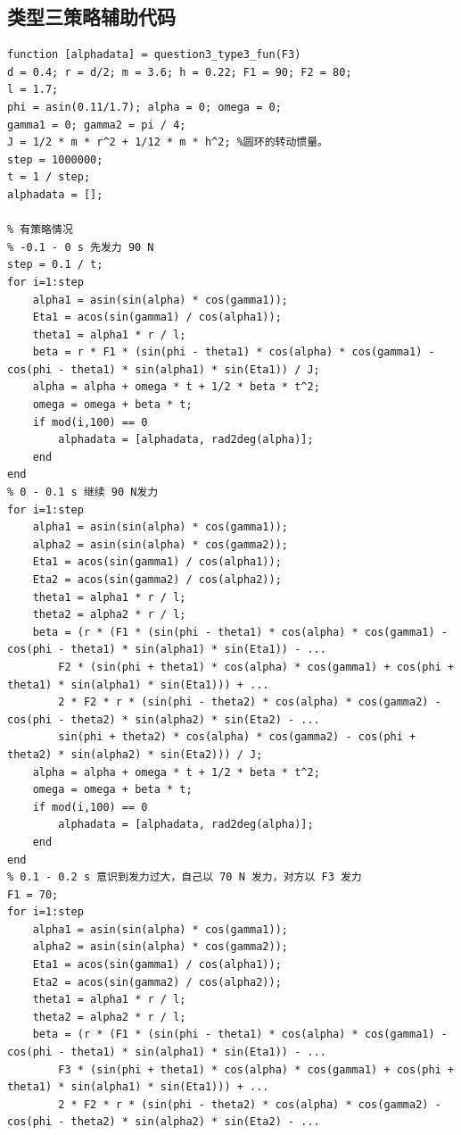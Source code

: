 \documentclass{cumcm}
\begin{document}
\subsection{类型三策略辅助代码}
\begin{lstlisting}
function [alphadata] = question3_type3_fun(F3)
d = 0.4; r = d/2; m = 3.6; h = 0.22; F1 = 90; F2 = 80;
l = 1.7;
phi = asin(0.11/1.7); alpha = 0; omega = 0;
gamma1 = 0; gamma2 = pi / 4;
J = 1/2 * m * r^2 + 1/12 * m * h^2; %圆环的转动惯量。
step = 1000000;
t = 1 / step;
alphadata = [];

% 有策略情况
% -0.1 - 0 s 先发力 90 N
step = 0.1 / t;
for i=1:step
    alpha1 = asin(sin(alpha) * cos(gamma1));
    Eta1 = acos(sin(gamma1) / cos(alpha1));
    theta1 = alpha1 * r / l;
    beta = r * F1 * (sin(phi - theta1) * cos(alpha) * cos(gamma1) - cos(phi - theta1) * sin(alpha1) * sin(Eta1)) / J;
    alpha = alpha + omega * t + 1/2 * beta * t^2;
    omega = omega + beta * t;
    if mod(i,100) == 0
        alphadata = [alphadata, rad2deg(alpha)];
    end
end
% 0 - 0.1 s 继续 90 N发力
for i=1:step
    alpha1 = asin(sin(alpha) * cos(gamma1));
    alpha2 = asin(sin(alpha) * cos(gamma2));
    Eta1 = acos(sin(gamma1) / cos(alpha1));
    Eta2 = acos(sin(gamma2) / cos(alpha2));
    theta1 = alpha1 * r / l;
    theta2 = alpha2 * r / l;
    beta = (r * (F1 * (sin(phi - theta1) * cos(alpha) * cos(gamma1) - cos(phi - theta1) * sin(alpha1) * sin(Eta1)) - ...
        F2 * (sin(phi + theta1) * cos(alpha) * cos(gamma1) + cos(phi + theta1) * sin(alpha1) * sin(Eta1))) + ...
        2 * F2 * r * (sin(phi - theta2) * cos(alpha) * cos(gamma2) - cos(phi - theta2) * sin(alpha2) * sin(Eta2) - ...
        sin(phi + theta2) * cos(alpha) * cos(gamma2) - cos(phi + theta2) * sin(alpha2) * sin(Eta2))) / J;
    alpha = alpha + omega * t + 1/2 * beta * t^2;
    omega = omega + beta * t;
    if mod(i,100) == 0
        alphadata = [alphadata, rad2deg(alpha)];
    end
end
% 0.1 - 0.2 s 意识到发力过大，自己以 70 N 发力，对方以 F3 发力
F1 = 70;
for i=1:step
    alpha1 = asin(sin(alpha) * cos(gamma1));
    alpha2 = asin(sin(alpha) * cos(gamma2));
    Eta1 = acos(sin(gamma1) / cos(alpha1));
    Eta2 = acos(sin(gamma2) / cos(alpha2));
    theta1 = alpha1 * r / l;
    theta2 = alpha2 * r / l;
    beta = (r * (F1 * (sin(phi - theta1) * cos(alpha) * cos(gamma1) - cos(phi - theta1) * sin(alpha1) * sin(Eta1)) - ...
        F3 * (sin(phi + theta1) * cos(alpha) * cos(gamma1) + cos(phi + theta1) * sin(alpha1) * sin(Eta1))) + ...
        2 * F2 * r * (sin(phi - theta2) * cos(alpha) * cos(gamma2) - cos(phi - theta2) * sin(alpha2) * sin(Eta2) - ...

\end{lstlisting}
\end{document}
